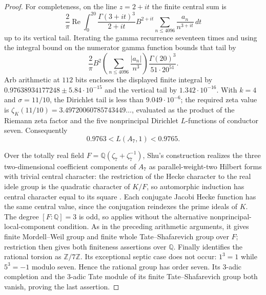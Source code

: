 \begin{proof}
For completeness, on the line $z=2+it$ the finite central sum is
\[
 \frac2\pi\operatorname{Re}\int_0^{20}
 \frac{\Gamma(3+it)^3}{2+it} B^{2+it}
 \sum_{n\le4096}\frac{a_n}{n^{3+it}}\,dt
\]
up to its vertical tail. Iterating the gamma recurrence seventeen
times and using the integral bound on the numerator gamma function
bounds that tail by
\[
 \frac2\pi B^2\left(\sum_{n\le4096}\frac{|a_n|}{n^3}\right)
 \frac{\Gamma(20)^3}{51\cdot20^{51}}.
\]
Arb arithmetic at $112$ bits encloses the displayed finite integral
by $0.97638934177248\pm5.84\cdot10^{-15}$ and the vertical tail by
$1.342\cdot10^{-16}$. With $k=4$ and $\sigma=11/10$, the Dirichlet
tail is less than $9.049\cdot10^{-6}$; the required zeta value is
$\zeta_K(11/10)=3.49720060785743449\ldots$, evaluated as the product
of the Riemann zeta factor and the five nonprincipal Dirichlet
$L$-functions of conductor seven. Consequently
\[
                 0.9763<L(A_7,1)<0.9765.
\]

Over the totally real field $F=\mathbb Q(\zeta_7+\zeta_7^{-1})$,
Shu's construction realizes the three two-dimensional coefficient
components of $A_7$ as parallel-weight-two Hilbert forms with trivial
central character: the restriction of the Hecke character to the real
idele group is the quadratic character of $K/F$, so automorphic
induction has central character equal to its square
\citep[\S3.4, p.~15]{ShuExpanded2021}. Each conjugate Jacobi Hecke function has the same
central value, since the conjugation reindexes the prime ideals of
$K$. The degree $[F:\mathbb Q]=3$ is odd, so
\citet[Theorem B and B-prime, p.~593; \S2.10.5, p.~641]{Nekovar2012}
applies without the alternative nonprincipal-local-component condition.
As in the preceding arithmetic arguments, it gives finite Mordell--Weil
group and finite whole Tate--Shafarevich group over $F$; restriction
then gives both finiteness assertions over $\mathbb Q$.
Finally \citet[Theorem 1.1, p.~202]{GrossRohrlich1978} identifies the
rational torsion as $\mathbb Z/7\mathbb Z$. Its exceptional septic
case does not occur: $1^3=1$ while $5^3=-1$ modulo seven.
Hence the rational group has order seven. Its $3$-adic completion
and the $3$-adic Tate module of its finite Tate--Shafarevich group both
vanish, proving the last assertion.
\end{proof}
